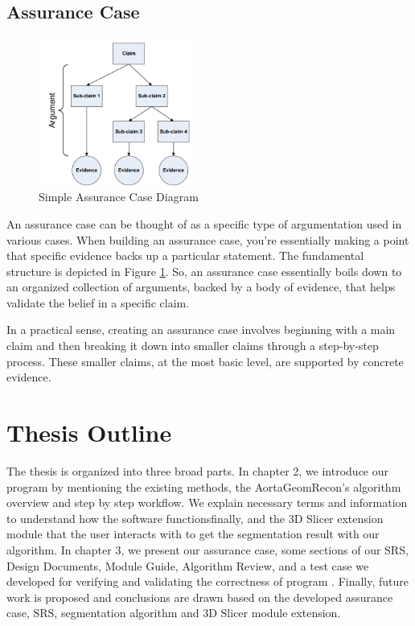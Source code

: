 \subsection{Assurance Case}

\begin{figure}[ht]
    \centering
    \includegraphics[width=0.45\textwidth]{figures/Intro/ac_diagram.png}
    \caption[Simple Assurance Case Diagram]{Simple Assurance Case Diagram \cite{doi:10.2514/6.2009-1921}}
    \label{fig_ac_diagram}
\end{figure}


An assurance case can be thought of as a specific type of argumentation used in various cases. When building an assurance case, you're essentially making a point that specific evidence backs up a particular statement. The fundamental structure is depicted in Figure \ref{fig_ac_diagram}. So, an assurance case essentially boils down to an organized collection of arguments, backed by a body of evidence, that helps validate the belief in a specific claim.

In a practical sense, creating an assurance case involves beginning with a main claim and then breaking it down into smaller claims through a step-by-step process. These smaller claims, at the most basic level, are supported by concrete evidence.


\section{Thesis Outline} \label{TO}

The thesis is organized into three broad parts. In chapter 2, we introduce our program \progname{} by mentioning the existing methods, the AortaGeomRecon's algorithm overview and step by step  workflow. We explain necessary terms and information to understand how the software functionsfinally, and the 3D Slicer extension module that the user interacts with to get the segmentation result with our algorithm. In chapter 3, we present our assurance case, some sections of our SRS, Design Documents, Module Guide, Algorithm Review, and a test case we developed for verifying and validating the correctness of program \progname{}. Finally, future work is proposed and conclusions are drawn based on the developed assurance case, SRS, segmentation algorithm and 3D Slicer module extension.